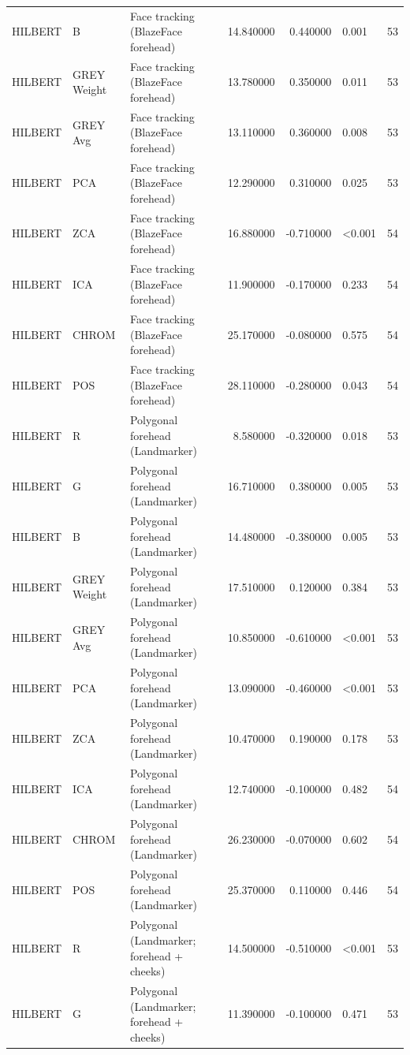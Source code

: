 \begin{table}[htbp]
\begin{tabular}{l l l r r l r}
HILBERT & B & Face tracking (BlazeFace forehead) & 14.840000 & 0.440000 & 0.001 & 53 \\
HILBERT & GREY Weight & Face tracking (BlazeFace forehead) & 13.780000 & 0.350000 & 0.011 & 53 \\
HILBERT & GREY Avg & Face tracking (BlazeFace forehead) & 13.110000 & 0.360000 & 0.008 & 53 \\
HILBERT & PCA & Face tracking (BlazeFace forehead) & 12.290000 & 0.310000 & 0.025 & 53 \\
HILBERT & ZCA & Face tracking (BlazeFace forehead) & 16.880000 & -0.710000 & <0.001 & 54 \\
HILBERT & ICA & Face tracking (BlazeFace forehead) & 11.900000 & -0.170000 & 0.233 & 54 \\
HILBERT & CHROM & Face tracking (BlazeFace forehead) & 25.170000 & -0.080000 & 0.575 & 54 \\
HILBERT & POS & Face tracking (BlazeFace forehead) & 28.110000 & -0.280000 & 0.043 & 54 \\
HILBERT & R & Polygonal forehead (Landmarker) & 8.580000 & -0.320000 & 0.018 & 53 \\
HILBERT & G & Polygonal forehead (Landmarker) & 16.710000 & 0.380000 & 0.005 & 53 \\
HILBERT & B & Polygonal forehead (Landmarker) & 14.480000 & -0.380000 & 0.005 & 53 \\
HILBERT & GREY Weight & Polygonal forehead (Landmarker) & 17.510000 & 0.120000 & 0.384 & 53 \\
HILBERT & GREY Avg & Polygonal forehead (Landmarker) & 10.850000 & -0.610000 & <0.001 & 53 \\
HILBERT & PCA & Polygonal forehead (Landmarker) & 13.090000 & -0.460000 & <0.001 & 53 \\
HILBERT & ZCA & Polygonal forehead (Landmarker) & 10.470000 & 0.190000 & 0.178 & 53 \\
HILBERT & ICA & Polygonal forehead (Landmarker) & 12.740000 & -0.100000 & 0.482 & 54 \\
HILBERT & CHROM & Polygonal forehead (Landmarker) & 26.230000 & -0.070000 & 0.602 & 54 \\
HILBERT & POS & Polygonal forehead (Landmarker) & 25.370000 & 0.110000 & 0.446 & 54 \\
HILBERT & R & Polygonal (Landmarker; forehead + cheeks) & 14.500000 & -0.510000 & <0.001 & 53 \\
HILBERT & G & Polygonal (Landmarker; forehead + cheeks) & 11.390000 & -0.100000 & 0.471 & 53 \\

\end{tabular}
\end{table}
